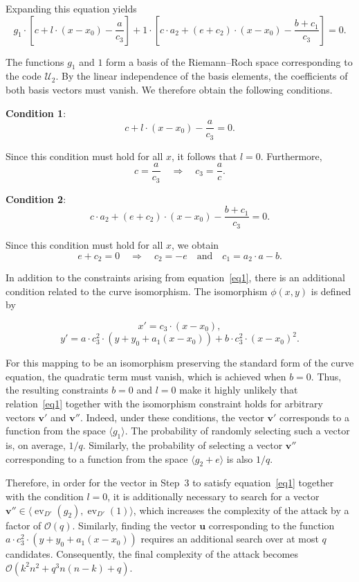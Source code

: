 \documentclass[sn-mathphys-num]{sn-jnl_modified}
\begin{document}
Expanding this equation yields
$$
g_1\cdot\left[c + l \cdot (x - x_0) - \frac{a}{c_3}\right]
+ 1\cdot\left[c \cdot a_2 + (e + c_2) \cdot (x - x_0) - \frac{b + c_1}{c_3}\right] = 0.
$$

The functions $g_1$ and $1$ form a basis of the Riemann--Roch space corresponding to the code $\mathcal{U}_2$. By the linear independence of the basis elements, the coefficients of both basis vectors must vanish. We therefore obtain the following conditions.

\textbf{Condition 1}:
$$
c + l \cdot (x - x_0) - \frac{a}{c_3} = 0.
$$

Since this condition must hold for all $x$, it follows that $l = 0$. Furthermore,
$$
c = \frac{a}{c_3}
\quad\Longrightarrow\quad
c_3 = \frac{a}{c}.
$$

\textbf{Condition 2}:
$$
c \cdot a_2 + (e + c_2) \cdot (x - x_0) - \frac{b + c_1}{c_3} = 0.
$$

Since this condition must hold for all $x$, we obtain
$$
e + c_2 = 0
\quad\Longrightarrow\quad
c_2 = -e \quad \text{and}\quad c_1 = a_2 \cdot a - b.
$$



In addition to the constraints arising from equation~\eqref{eq1}, there is an additional condition related to the curve isomorphism. The isomorphism $\phi(x, y)$ is defined by

$$
x' = c_3 \cdot (x - x_0),
$$
$$
y' = a \cdot c_3^2 \cdot (y + y_0 + a_1(x - x_0))
+ b \cdot c_3^2 \cdot (x - x_0)^2.
$$

For this mapping to be an isomorphism preserving the standard form of the curve equation, the quadratic term must vanish, which is achieved when $b = 0$. Thus, the resulting constraints $b = 0$ and $l = 0$ make it highly unlikely that relation~\eqref{eq1} together with the isomorphism constraint holds for arbitrary vectors $\mathbf{v}'$ and $\mathbf{v}''$. Indeed, under these conditions, the vector $\mathbf{v}'$ corresponds to a function from the space $\langle g_1\rangle$. The probability of randomly selecting such a vector is, on average, $1/q$. Similarly, the probability of selecting a vector $\mathbf{v}''$ corresponding to a function from the space $\langle g_2 + e\rangle$ is also $1/q$.

Therefore, in order for the vector in Step~3 to satisfy equation~\eqref{eq1} together with the condition $l = 0$, it is additionally necessary to search for a vector $\mathbf{v}'' \in \langle \operatorname{ev}_{D'}(g_2), \operatorname{ev}_{D'}(1) \rangle$, which increases the complexity of the attack by a factor of $\mathcal{O}(q)$. Similarly, finding the vector $\mathbf{u}$ corresponding to the function $a \cdot c_3^2 \cdot (y + y_0 + a_1(x - x_0))$ requires an additional search over at most $q$ candidates. Consequently, the final complexity of the attack becomes $\mathcal{O}(k^2n^2 + q^3n(n-k) + q)$. 
\end{document}
